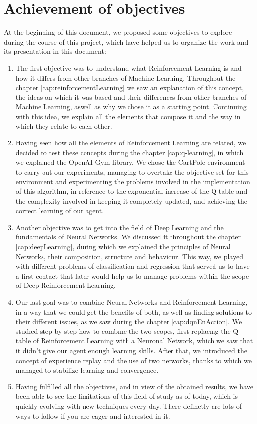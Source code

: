 \section{Achievement of objectives}

At the beginning of this document, we proposed some objectives to explore during the course of this project, which have helped us to organize the work and its presentation in this document:

\begin{enumerate}
        \item The first objective was to understand what Reinforcement Learning is and how it differs from other branches of Machine Learning. Throughout the chapter \ref{cap:reinforcementLearning} we saw an explanation of this concept, the ideas on which it was based and their differences from other branches of Machine Learning, aswell as why we chose it as a starting point. Continuing with this idea, we explain all the elements that compose it and the way in which they relate to each other.
        \item Having seen how all the elements of Reinforcement Learning are related, we decided to test these concepts during the chapter \ref{cap:q-learning}, in which we explained the OpenAI Gym library. We chose the CartPole environment to carry out our experiments, managing to overtake the objective set for this environment and experimenting the problems involved in the implementation of this algorithm, in reference to the exponential increase of the Q-table and the complexity involved in keeping it completely updated, and achieving the correct learning of our agent.
        \item Another objective was to get into the field of Deep Learning and the fundamentals of Neural Networks. We discussed it throughout the chapter \ref{cap:deepLearning}, during which we explained the principles of Neural Networks, their composition, structure and behaviour. This way, we played with different problems of classification and regression that served us to have a first contact that later would help us to manage problems within the scope of Deep Reinforcement Learning.
        \item Our last goal was to combine Neural Networks and Reinforcement Learning, in a way that we could get the benefits of both, as well as finding solutions to their different issues, as we saw during the chapter \ref{cap:dqnEnAccion}. We studied step by step how to combine the two scopes, first replacing the Q-table of Reinforcement Learning with a Neuronal Network, which we saw that it didn't give our agent enough learning skills. After that, we introduced the concept of experience replay and the use of two networks, thanks to which we managed to stabilize learning and convergence.
        \item Having fulfilled all the objectives, and in view of the obtained results, we have been able to see the limitations of this field of study as of today, which is quickly evolving with new techniques every day. There definetly are lots of ways to follow if you are eager and interested in it.
\end{enumerate}

